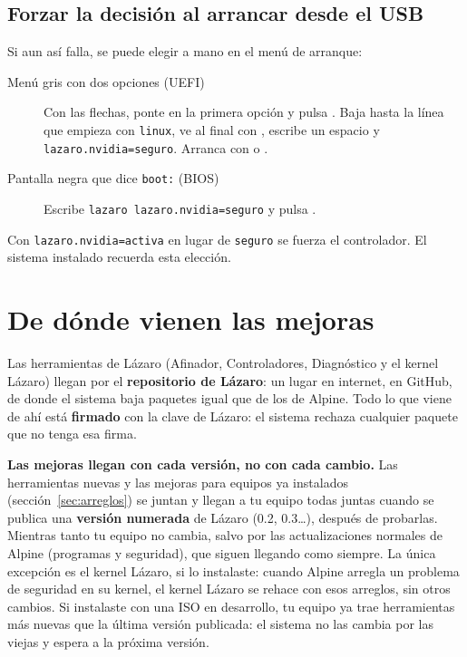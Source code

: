 \subsection{Forzar la decisión al arrancar desde el USB}
Si aun así falla, se puede elegir a mano en el menú de arranque:
\begin{description}
  \item[Menú gris con dos opciones (UEFI)] Con las flechas, ponte en la
    primera opción y pulsa . Baja hasta la línea que empieza con
    \texttt{linux}, ve al final con , escribe un espacio y
    \texttt{lazaro.nvidia=seguro}. Arranca con  o
    .
  \item[Pantalla negra que dice \texttt{boot:} (BIOS)] Escribe
    \texttt{lazaro lazaro.nvidia=seguro} y pulsa .
\end{description}
Con \texttt{lazaro.nvidia=activa} en lugar de \texttt{seguro} se fuerza el
controlador. El sistema instalado recuerda esta elección.

\section{De dónde vienen las mejoras}\label{sec:repositorio-lazaro}

Las herramientas de Lázaro (Afinador, Controladores, Diagnóstico y el
kernel Lázaro) llegan por el \textbf{repositorio de Lázaro}: un lugar en
internet, en GitHub, de donde el sistema baja paquetes igual que de los
de Alpine. Todo lo que viene de ahí está \textbf{firmado} con la clave de
Lázaro: el sistema rechaza cualquier paquete que no tenga esa firma.

\textbf{Las mejoras llegan con cada versión, no con cada cambio.} Las
herramientas nuevas y las mejoras para equipos ya instalados
(sección~\ref{sec:arreglos}) se juntan y llegan a tu equipo todas juntas
cuando se publica una \textbf{versión numerada} de Lázaro (0.2, 0.3\ldots),
después de probarlas. Mientras tanto tu equipo no cambia, salvo por las
actualizaciones normales de Alpine (programas y seguridad), que siguen
llegando como siempre. La única excepción es el kernel Lázaro, si lo
instalaste: cuando Alpine arregla un problema de seguridad en su kernel,
el kernel Lázaro se rehace con esos arreglos, sin otros cambios. Si
instalaste con una ISO en desarrollo, tu equipo ya trae herramientas más
nuevas que la última versión publicada: el sistema no las cambia por las
viejas y espera a la próxima versión.

